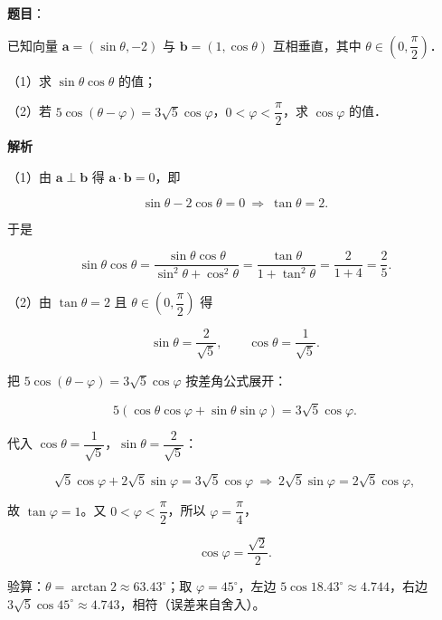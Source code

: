 \begin{answer}

\textbf{题目}：

已知向量 $\boldsymbol a=(\sin\theta,-2)$ 与 $\boldsymbol b=(1,\cos\theta)$ 互相垂直，其中 $\theta\in\left(0,\dfrac{\pi}{2}\right)$．

（1）求 $\sin\theta\cos\theta$ 的值；

（2）若 $5\cos(\theta-\varphi)=3\sqrt5\cos\varphi$，$0<\varphi<\dfrac{\pi}{2}$，求 $\cos\varphi$ 的值．

\textbf{解析}

（1）由 $\boldsymbol a\perp\boldsymbol b$ 得 $\boldsymbol a\cdot\boldsymbol b=0$，即

\nopagebreak[4]
\[\sin\theta-2\cos\theta=0\ \Longrightarrow\ \tan\theta=2.\]

于是

\nopagebreak[4]
\[\sin\theta\cos\theta=\frac{\sin\theta\cos\theta}{\sin^2\theta+\cos^2\theta}=\frac{\tan\theta}{1+\tan^2\theta}=\frac{2}{1+4}=\frac25.\]

（2）由 $\tan\theta=2$ 且 $\theta\in\left(0,\dfrac{\pi}{2}\right)$ 得

\nopagebreak[4]
\[\sin\theta=\frac{2}{\sqrt5},\qquad \cos\theta=\frac{1}{\sqrt5}.\]

把 $5\cos(\theta-\varphi)=3\sqrt5\cos\varphi$ 按差角公式展开：

\nopagebreak[4]
\[5(\cos\theta\cos\varphi+\sin\theta\sin\varphi)=3\sqrt5\cos\varphi.\]

代入 $\cos\theta=\dfrac{1}{\sqrt5}$，$\sin\theta=\dfrac{2}{\sqrt5}$：

\nopagebreak[4]
\[\sqrt5\cos\varphi+2\sqrt5\sin\varphi=3\sqrt5\cos\varphi\ \Longrightarrow\ 2\sqrt5\sin\varphi=2\sqrt5\cos\varphi,\]

故 $\tan\varphi=1$。又 $0<\varphi<\dfrac{\pi}{2}$，所以 $\varphi=\dfrac{\pi}{4}$，

\nopagebreak[4]
\[\cos\varphi=\frac{\sqrt2}{2}.\]

验算：$\theta=\arctan2\approx63.43^\circ$；取 $\varphi=45^\circ$，左边 $5\cos18.43^\circ\approx4.744$，右边 $3\sqrt5\cos45^\circ\approx4.743$，相符（误差来自舍入）。


\end{answer}

